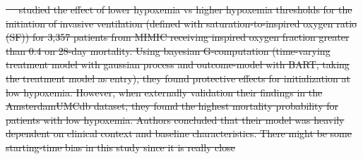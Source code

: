 \documentclass[10pt,letterpaper]{article}
\providecommand{\DIFdeltex}[1]{{\protect\color{red}\sout{#1}}}                      %
\providecommand{\DIFdelbegin}{} %
\providecommand{\DIFdelend}{} %
\providecommand{\DIFdel}[1]{\texorpdfstring{\DIFdeltex{#1}}{}} %
\newcommand{\DIFscaledelfig}{0.5}
\newlength{\DIFdelgraphicswidth} %
\newlength{\DIFdelgraphicsheight} %
\newcommand{\DIFdelincludegraphics}[2][]{%
\sbox{\DIFdelgraphicsbox}{\DIFOincludegraphics[#1]{#2}}%
\settoboxwidth{\DIFdelgraphicswidth}{\DIFdelgraphicsbox} %
\settoboxtotalheight{\DIFdelgraphicsheight}{\DIFdelgraphicsbox} %
\scalebox{\DIFscaledelfig}{%
\parbox[b]{\DIFdelgraphicswidth}{\usebox{\DIFdelgraphicsbox}\\[-\baselineskip] \rule{\DIFdelgraphicswidth}{0em}}\llap{\resizebox{\DIFdelgraphicswidth}{\DIFdelgraphicsheight}{%
\setlength{\unitlength}{\DIFdelgraphicswidth}%
\begin{picture}(1,1)%
\thicklines\linethickness{2pt} %
{\color[rgb]{1,0,0}\put(0,0){\framebox(1,1){}}}%
{\color[rgb]{1,0,0}\put(0,0){\line( 1,1){1}}}%
{\color[rgb]{1,0,0}\put(0,1){\line(1,-1){1}}}%
\end{picture}%
}\hspace*{3pt}}} %
} %
\DeclareRobustCommand{\DIFdelbegin}{\DIFOdelbegin \let\includegraphics\DIFdelincludegraphics} %
\DeclareRobustCommand{\DIFdelend}{\DIFOaddend \let\includegraphics\DIFOincludegraphics} %
\begin{document}
\DIFdelbegin %
\DIFdel{\mbox{%
  \cite{yarnell2023oxygenation} }\hskip0pt%
studied the effect of \textcolor{I}{lower hypoxemia} vs \textcolor{C}{higher
  hypoxemia thresholds for the initiation of invasive ventilation} (defined with saturation-to-inspired oxygen ratio (SF)) for
\textcolor{P}{3,357 patients from MIMIC receiving inspired oxygen fraction greater than 0.4} on \textcolor{O}{28-day
  mortality}. Using bayesian G-computation (time-varying treatment model with
gaussian process and outcome-model with BART, taking the treatment model as
entry), they found protective effects for initialization at low hypoxemia.
However, when externally validation their findings in the AmsterdamUMCdb dataset,
they found the highest mortality probability for patients with low hypoxemia.
Authors concluded that their model was heavily dependent on clinical context
and baseline characteristics. There might be some starting-time bias in this study since it is really close
}\DIFdelend %
\end{document}
